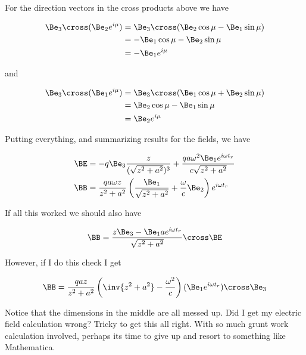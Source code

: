 
For the direction vectors in the cross products above we have

\begin{align*}
\Be_3 \cross (\Be_2 e^{i \mu})
&=
\Be_3 \cross (\Be_2 \cos\mu - \Be_1 \sin\mu) \\
&=
-\Be_1 \cos\mu - \Be_2 \sin\mu \\
&=
-\Be_1 e^{i \mu}
\end{align*}

and

\begin{align*}
\Be_3 \cross (\Be_1 e^{i \mu})
&=
\Be_3 \cross (\Be_1 \cos\mu + \Be_2 \sin\mu) \\
&=
\Be_2 \cos\mu - \Be_1 \sin\mu \\
&=
\Be_2 e^{i \mu}
\end{align*}

Putting everything, and summarizing results for the fields, we have

\begin{align}\label{eqn:relativisticElectrodynamicsExamReflection:n}
\BE &= 
-q \Be_3 \frac{z}{(\sqrt{z^2 + a^2})^3}
+
\frac{q a \omega^2 \Be_1 e^{i \omega t_r} }{c \sqrt{z^2 + a^2}} \\
\BB 
&= \frac{q a \omega z}{ z^2 + a^2} \left( \frac{\Be_1}{\sqrt{z^2 + a^2}} + \frac{\omega}{c} \Be_2 \right) e^{i \omega t_r}
\end{align}

If all this worked we should also have

\begin{equation}\label{eqn:relativisticElectrodynamicsExamReflection:n}
\BB = \frac{z \Be_3 - \Be_1 a e^{i \omega t_r}}{\sqrt{z^2 + a^2}} \cross \BE
\end{equation}

However, if I do this check I get

\begin{equation}\label{eqn:relativisticElectrodynamicsExamReflection:n}
\BB = \frac{q a z}{z^2 + a^2} \left( \inv{z^2 + a^2} - \frac{\omega^2 }{c} \right) (\Be_1 e^{i \omega t_r}) \cross \Be_3
\end{equation}

Notice that the dimensions in the middle are all messed up.  Did I get my electric field calculation wrong?  Tricky to get this all right.  With so much grunt work calculation involved, perhaps its time to give up and resort to something like Mathematica.

